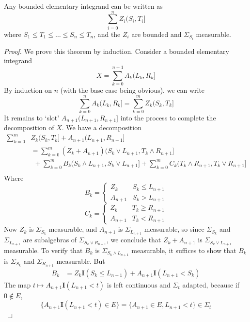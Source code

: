 \begin{lemma}
    Any bounded elementary integrand can be written as
    \[ \sum_{i = 0}^n Z_i(S_i,T_i] \]
    where $S_1 \leq T_1 \leq \dots \leq S_n \leq T_n$, and the $Z_i$ are bounded and $\Sigma_{S_i}$ measurable.
\end{lemma}
\begin{proof}
    We prove this theorem by induction. Consider a bounded elementary integrand
    \[ X = \sum_{k = 0}^{n+1} A_k(L_k,R_k] \]
    By induction on $n$ (with the base case being obvious), we can write
    \[ \sum_{k = 0}^n A_k(L_k,R_k] = \sum_{k = 0}^m Z_k(S_k,T_k] \]
    It remains to `slot' $A_{n+1}(L_{n+1},R_{n+1}]$ into the process to complete the decomposition of $X$. We have a decomposition
    \begin{align*}
        \sum_{k = 0}^m & Z_k(S_k,T_k] + A_{n+1}(L_{n+1},R_{n+1}]\\
            &= \sum_{k = 0}^m (Z_k + A_{n+1}) (S_k \vee L_{n+1}, T_k \wedge R_{n+1}]\\
        &\ \ + \sum_{k = 0}^m B_k (S_k \wedge L_{n+1}, S_k \vee L_{n+1}] + \sum_{k = 0}^m C_k (T_k \wedge R_{n+1}, T_k \vee R_{n+1}]\\
    \end{align*}
    Where
    \[ B_k = \begin{cases} Z_k & S_k \leq L_{n+1} \\ A_{n+1} & S_k > L_{n+1} \end{cases} \]
    \[ C_k = \begin{cases} Z_k & T_k \geq R_{n+1} \\ A_{n+1} & T_k < R_{n+1} \end{cases} \]
    Now $Z_k$ is $\Sigma_{S_k}$ measurable, and $A_{n+1}$ is $\Sigma_{L_{n+1}}$ measurable, so since $\Sigma_{S_k}$ and $\Sigma_{L_{n+1}}$ are subalgebras of $\Sigma_{S_k \vee R_{n+1}}$, we conclude that $Z_k + A_{n+1}$ is $\Sigma_{S_k \vee L_{n+1}}$ measurable. To verify that $B_k$ is $\Sigma_{S_k \wedge L_{n+1}}$ measurable, it suffices to show that $B_k$ is $\Sigma_{S_k}$ and $\Sigma_{R_{n+1}}$ measurable. But
    \begin{align*}
        B_k &= Z_k \mathbf{I}(S_k \leq L_{n+1}) + A_{n+1} \mathbf{I}(L_{n+1} < S_k)
    \end{align*}
    The map $t \mapsto A_{n+1} \mathbf{I}(L_{n+1} < t)$ is left continuous and $\Sigma_t$ adapted, because if $0 \not \in E$,
    \[ \{ A_{n+1} \mathbf{I}(L_{n+1} < t) \in E \} = \{ A_{n+1} \in E, L_{n+1} < t \} \in \Sigma_t \]

\end{proof}
